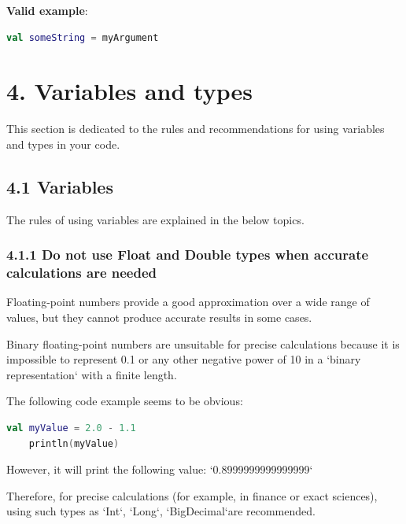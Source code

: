 {{{{\textbf{Valid example}:

\begin{lstlisting}[language=Kotlin]
val someString = myArgument
\end{lstlisting}
\section*{\textbf{4. Variables and types}}

\label{sec:4.}

This section is dedicated to the rules and recommendations for using variables and types in your code.

\subsection*{\textbf{4.1 Variables}}

\label{sec:4.1}

The rules of using variables are explained in the below topics.

\subsubsection*{\textbf{4.1.1 Do not use Float and Double types when accurate calculations are needed}}
\leavevmode\newline

\label{sec:4.1.1}

Floating-point numbers provide a good approximation over a wide range of values, but they cannot produce accurate results in some cases.

Binary floating-point numbers are unsuitable for precise calculations because it is impossible to represent 0.1 or any other negative power of 10 in a `binary representation` with a finite length.



The following code example seems to be obvious: 

\begin{lstlisting}[language=Kotlin]
    val myValue = 2.0 - 1.1
    println(myValue)
\end{lstlisting}


However, it will print the following value: `0.8999999999999999`



Therefore, for precise calculations (for example, in finance or exact sciences), using such types as `Int`, `Long`, `BigDecimal`are recommended.

}}}}

